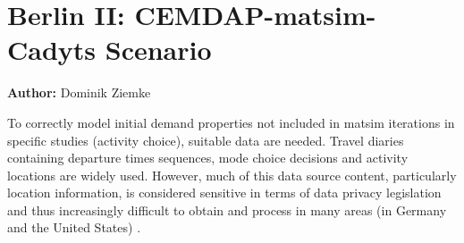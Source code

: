 \chapter{Berlin II: CEMDAP-\protect\gls{matsim}-Cadyts Scenario}
\label{ch:berlinII}
\hfill \textbf{Author:} Dominik Ziemke


%
To correctly model initial demand properties not included in \gls{matsim} iterations in specific studies (\ie activity choice), suitable data are needed. Travel diaries containing departure times sequences, mode choice decisions and activity locations are widely used.
%
However, much of this data source content, particularly location information, is considered sensitive in terms of data privacy legislation and thus increasingly difficult to obtain and process in many areas (\eg in Germany and the United States) \citep{ZiemkeNagelBhat2015IntegratingCemdapMatsimTransferabilityTRB}.

